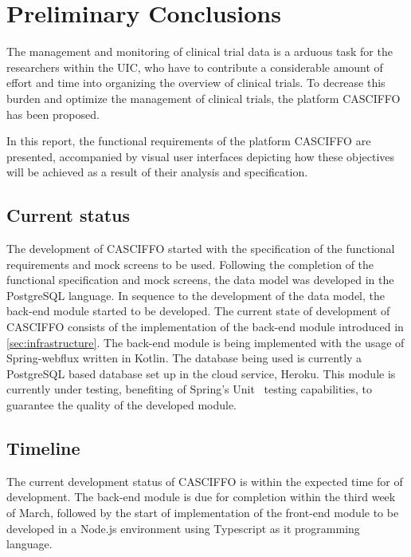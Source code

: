 \chapter{Preliminary Conclusions}
The management and monitoring of clinical trial data is a arduous task for the researchers within the UIC, who have to contribute a considerable amount of effort and time into organizing the overview of clinical trials. To decrease this burden and optimize the management of clinical trials, the platform CASCIFFO has been proposed.

In this report, the functional requirements of the platform CASCIFFO are presented, accompanied by visual user interfaces depicting how these objectives will be achieved as a result of their analysis and specification.

\section{Current status}
The development of CASCIFFO started with the specification of the functional requirements and mock screens to be used. Following the completion of the functional specification and mock screens, the data model was developed in the PostgreSQL language. In sequence to the development of the data model, the back-end module started to be developed.
The current state of development of CASCIFFO consists of the implementation of the back-end module introduced in \ref{sec:infrastructure}. The back-end module is being implemented with the usage of Spring-webflux written in Kotlin. The database being used is currently a PostgreSQL based database set up in the cloud service, Heroku. This module is currently under testing, benefiting of Spring's Unit~\cite{spring-testing-unit} testing capabilities, to guarantee the quality of the developed module.

\section{Timeline}
The current development status of CASCIFFO is within the expected time for of development. The back-end module is due for completion within the third week of March, followed by the start of implementation of the front-end module to be developed in a Node.js environment using Typescript as it programming language.
